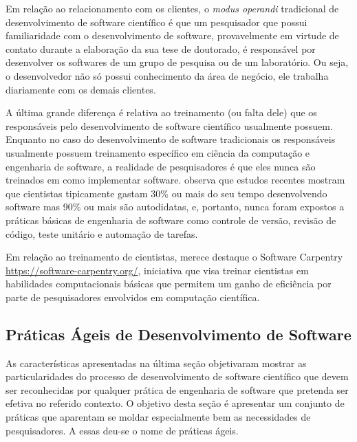 \documentclass[
	article,			%
	11pt,				%
	oneside,			%
	a4paper,			%
	english,			%
	brazil,				%
	sumario=tradicional
	]{abntex2}
\begin{document}

Em relação ao relacionamento com os clientes, o \emph{modus operandi} tradicional de desenvolvimento de software científico é que um pesquisador que possui familiaridade com o desenvolvimento de software, provavelmente em virtude de contato durante a elaboração da sua tese de doutorado, é responsável por desenvolver os softwares de um grupo de pesquisa ou de um laboratório. Ou seja, o desenvolvedor não só possui conhecimento da área de negócio, ele trabalha diariamente com os demais clientes.


A última grande diferença é relativa ao treinamento (ou falta dele) que os responsáveis pelo desenvolvimento de software científico usualmente possuem. Enquanto no caso do desenvolvimento de software tradicionais os responsáveis usualmente possuem treinamento específico em ciência da computação e engenharia de software, a realidade de pesquisadores é que eles nunca são treinados em como implementar software.  observa que estudos recentes mostram que cientistas tipicamente gastam 30\% ou mais do seu tempo desenvolvendo software mas 90\% ou mais são autodidatas, e, portanto, nunca foram expostos a práticas básicas de engenharia de software como controle de versão, revisão de código, teste unitário e automação de tarefas. 

Em relação ao treinamento de cientistas, merece destaque o Software Carpentry \url{https://software-carpentry.org/}, iniciativa que visa treinar cientistas em habilidades computacionais básicas que permitem um ganho de eficiência por parte de pesquisadores envolvidos em computação científica.

\subsection*{Práticas Ágeis de Desenvolvimento de Software}
As características apresentadas na última seção objetivaram mostrar as particularidades do processo de desenvolvimento de software científico que devem ser reconhecidas por qualquer prática de engenharia de software que pretenda ser efetiva no referido contexto. O objetivo desta seção é apresentar um conjunto de práticas que aparentam se moldar especialmente bem as necessidades de pesquisadores. A essas deu-se o nome de práticas ágeis.
\end{document}
